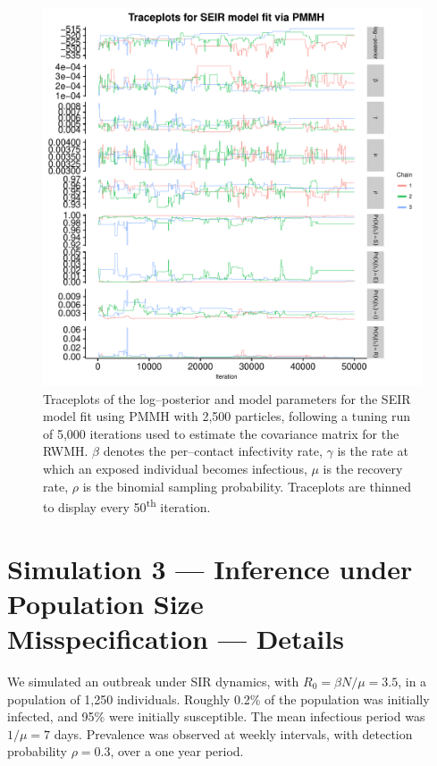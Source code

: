 \begin{figure}[htbp]
	\centering
	\includegraphics[width=0.9\linewidth]{figures/misspec_seir_pmmh_traceplots.pdf}
	\caption[Simulation 2 MCMC traceplots for SEIR model parameters fit using PMMH.]{Traceplots of the log--posterior and model parameters for the SEIR model fit using PMMH with 2,500 particles, following a tuning run of 5,000 iterations used to estimate the covariance matrix for the RWMH. $ \beta $ denotes the per--contact infectivity rate,  $ \gamma $ is the rate at which an exposed individual becomes infectious, $ \mu $ is the recovery rate, $ \rho $ is the binomial sampling probability. Traceplots are thinned to display every 50\textsuperscript{th} iteration.}
	\label{fig:misspec_seir_pmmh_traceplots}
\end{figure}

\newpage

\section{Simulation 3 --- Inference under Population Size\\ Misspecification --- Details}
\label{sec:popsize_misspec_details}
We simulated an outbreak under SIR dynamics, with $ R_0 = \beta N / \mu =3.5 $, in a population of 1,250 individuals. Roughly 0.2\% of the population was initially infected, and 95\% were initially susceptible. The mean infectious period was $ 1/\mu = 7 $ days. Prevalence was observed at weekly intervals, with detection probability $ \rho = 0.3 $, over a one year period.


